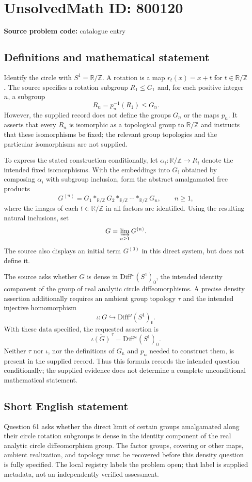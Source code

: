\documentclass[11pt]{article}
\newcommand{\Z}{\mathbb{Z}}
\newcommand{\R}{\mathbb{R}}
\begin{document}
\section*{UnsolvedMath ID: 800120}
\textbf{Source problem code:} catalogue entry
\subsection{Definitions and mathematical statement}
Identify the circle with $S^1=\R/\Z$. A rotation is a map $r_t(x)=x+t$ for $t\in\R/\Z$. The source specifies a rotation subgroup $R_1\leq G_1$ and, for each positive integer $n$, a subgroup
\[
R_n=p_n^{-1}(R_1)\leq G_n.
\]
However, the supplied record does not define the groups $G_n$ or the maps $p_n$. It asserts that every $R_n$ is isomorphic as a topological group to $\R/\Z$ and instructs that these isomorphisms be fixed; the relevant group topologies and the particular isomorphisms are not supplied.

To express the stated construction conditionally, let $\alpha_i:\R/\Z\longrightarrow R_i$ denote the intended fixed isomorphisms. With the embeddings into $G_i$ obtained by composing $\alpha_i$ with subgroup inclusion, form the abstract amalgamated free products
\[
G^{(n)}=G_1*_{\R/\Z}G_2*_{\R/\Z}\cdots*_{\R/\Z}G_n,
\qquad n\geq 1,
\]
where the images of each $t\in\R/\Z$ in all factors are identified. Using the resulting natural inclusions, set
\[
G=\varinjlim_{n\geq 1}G^{(n)}.
\]
The source also displays an initial term $G^{(0)}$ in this direct system, but does not define it.

The source asks whether $G$ is dense in $\mathrm{Diff}^{\omega}(S^1)_0$, the intended identity component of the group of real analytic circle diffeomorphisms. A precise density assertion additionally requires an ambient group topology $\tau$ and the intended injective homomorphism
\[
\iota:G\hookrightarrow\mathrm{Diff}^{\omega}(S^1)_0.
\]
With these data specified, the requested assertion is
\[
\overline{\iota(G)}^{\,\tau}=\mathrm{Diff}^{\omega}(S^1)_0.
\]
Neither $\tau$ nor $\iota$, nor the definitions of $G_n$ and $p_n$ needed to construct them, is present in the supplied record. Thus this formula records the intended question conditionally; the supplied evidence does not determine a complete unconditional mathematical statement.
\subsection{Short English statement}
Question 61 asks whether the direct limit of certain groups amalgamated along their circle rotation subgroups is dense in the identity component of the real analytic circle diffeomorphism group. The factor groups, covering or other maps, ambient realization, and topology must be recovered before this density question is fully specified. The local registry labels the problem open; that label is supplied metadata, not an independently verified assessment.
\end{document}
